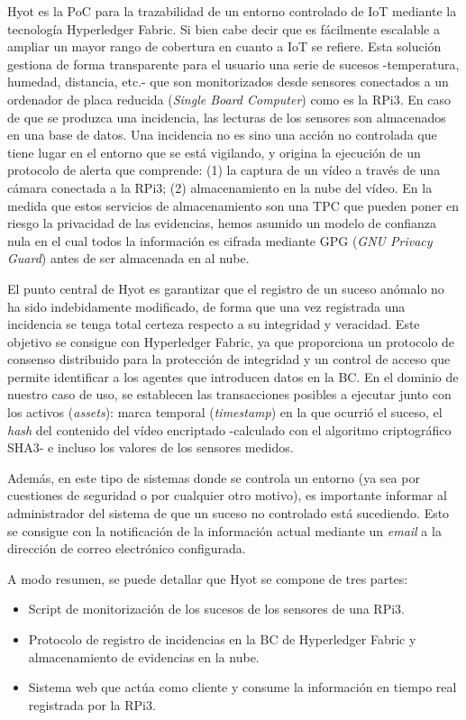 \documentclass[10pt,conference,a4paper]{IEEEtran}
\begin{document}
Hyot es la PoC para la trazabilidad de un entorno controlado de IoT mediante la tecnología Hyperledger Fabric. Si bien cabe decir que es
fácilmente escalable a ampliar un mayor rango de cobertura en cuanto a
IoT se refiere. Esta solución gestiona de forma transparente para el
usuario una serie de sucesos -temperatura, humedad, distancia, etc.-
que son monitorizados desde sensores conectados a un ordenador de
placa reducida (\textit{Single Board Computer}) como es la RPi3. En caso de que se produzca una incidencia, las lecturas de los
sensores son almacenados en una base de datos. Una incidencia no es
sino una acción no controlada que tiene lugar en el entorno que se
está vigilando, y origina la ejecución de un protocolo de alerta que
comprende: (1) la captura de un vídeo a través de una cámara conectada
a la RPi3; (2) almacenamiento en la nube del vídeo. En la
medida que estos servicios de almacenamiento son una TPC que pueden
poner en riesgo la privacidad de las evidencias, hemos asumido un
modelo de confianza nula en el cual todos la información es cifrada
mediante  GPG (\textit{GNU Privacy Guard}) antes de ser almacenada en
al nube.

El punto central de Hyot es garantizar que el
registro de un  suceso anómalo no ha sido indebidamente
modificado, de forma que una vez registrada una incidencia se tenga
total certeza respecto a su integridad y veracidad. Este objetivo se
consigue con Hyperledger Fabric, ya que proporciona un
protocolo de consenso distribuido para la protección de integridad y
un control de acceso que permite identificar a los agentes que
introducen datos en la BC. En el dominio de nuestro caso de uso, se establecen las transacciones posibles a ejecutar junto con
los activos (\textit{assets}): marca temporal (\textit{timestamp}) en
la que ocurrió el suceso, el \textit{hash} del contenido del vídeo
encriptado -calculado con el algoritmo criptográfico SHA3- e incluso
los valores de los sensores medidos.

Además, en este tipo de sistemas donde se controla un entorno (ya sea
por cuestiones de seguridad o por cualquier otro motivo), es importante
informar al administrador del sistema de que un suceso no
controlado está sucediendo. Esto se consigue con la notificación de la
información actual mediante un \textit{email} a la dirección de correo
electrónico configurada.

A modo resumen, se puede detallar que Hyot se compone de tres partes:

\begin{itemize}
  \item Script de monitorización de los sucesos de los sensores de una RPi3.
  \item Protocolo de registro de incidencias en la BC de Hyperledger
    Fabric y almacenamiento de evidencias en la nube. 
  \item Sistema web que actúa como cliente y consume la
          información en tiempo real registrada por la RPi3.
\end{itemize}
\end{document}
